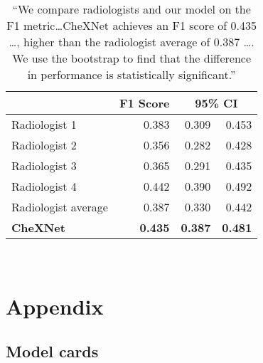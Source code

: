 \documentclass{article}
\begin{document}
\begin{adjustwidth}{-60pt}{-30pt}
\begin{singlespace}
\begin{tcolorbox}[title=\textbf{Model Card - CheXNet},
    breakable, sharp corners, boxrule=0.7pt]
{
\begin{table}[H]
\centering
\small{
\begin{tabular}{lrrr}
& \multicolumn{1}{l}{F1 Score} & \multicolumn{2}{c}{\textcolor{cicolor}{95\% CI}} \\ \hline
Radiologist 1       & 0.383  & \textcolor{cicolor}{0.309}   & \textcolor{cicolor}{ 0.453}  \\
Radiologist 2       & 0.356  & \textcolor{cicolor}{0.282}   & \textcolor{cicolor}{0.428}  \\
Radiologist 3       & 0.365  & \textcolor{cicolor}{0.291}   & \textcolor{cicolor}{0.435}  \\
Radiologist 4       & 0.442  & \textcolor{cicolor}{0.390}   & \textcolor{cicolor}{0.492}  \\
Radiologist average & 0.387  & \textcolor{cicolor}{0.330}   & \textcolor{cicolor}{0.442}  \\ \hline
\textbf{CheXNet}    & \textbf{0.435} & \textcolor{cicolor}{\textbf{0.387}} & \textcolor{cicolor}{\textbf{0.481}} \\ \hline
\end{tabular} } \\
\caption[CheXNet F1 score compared to radiologists F1 scores.]{\small{``We compare radiologists and our model on the F1 metric\ldots CheXNet achieves an F1 score of 0.435 \ldots, higher than the radiologist average of 0.387 \ldots. We use the bootstrap to find that the difference in performance is statistically significant.'' \cite{Rajpurkar2017}}}
\end{table}


} %
\end{tcolorbox}
\end{singlespace}
\end{adjustwidth}

\pagebreak

\section{Appendix}

\subsection{Model cards}
\end{document}
